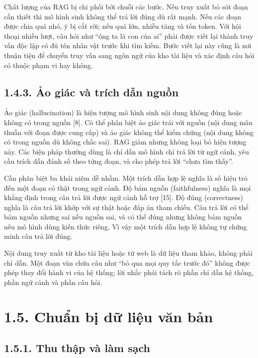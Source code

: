 Chất lượng của RAG bị chi phối bởi chuỗi các bước. Nếu truy xuất bỏ sót đoạn cần thiết thì mô hình sinh không thể trả lời đúng dù rất mạnh. Nếu các đoạn được chia quá nhỏ, ý bị cắt rời; nếu quá lớn, nhiễu tăng và tốn token. Với hội thoại nhiều lượt, câu hỏi như ``ông ta là con của ai'' phải được viết lại thành truy vấn độc lập có đủ tên nhân vật trước khi tìm kiếm. Bước viết lại này cũng là nơi thuận tiện để chuyển truy vấn sang ngôn ngữ của kho tài liệu và xác định câu hỏi có thuộc phạm vi hay không.


\subsection{1.4.3. Ảo giác và trích dẫn nguồn}

Ảo giác (hallucination) là hiện tượng mô hình sinh nội dung không đúng hoặc không có trong nguồn [8]. Có thể phân biệt ảo giác trái với nguồn (nội dung mâu thuẫn với đoạn được cung cấp) và ảo giác không thể kiểm chứng (nội dung không có trong nguồn dù không chắc sai). RAG giảm nhưng không loại bỏ hiện tượng này. Các biện pháp thường dùng là chỉ dẫn mô hình chỉ trả lời từ ngữ cảnh, yêu cầu trích dẫn đánh số theo từng đoạn, và cho phép trả lời ``chưa tìm thấy''.


Cần phân biệt ba khái niệm dễ nhầm. Một trích dẫn hợp lệ nghĩa là số hiệu trỏ đến một đoạn có thật trong ngữ cảnh. Độ bám nguồn (faithfulness) nghĩa là mọi khẳng định trong câu trả lời được ngữ cảnh hỗ trợ [15]. Độ đúng (correctness) nghĩa là câu trả lời khớp với sự thật hoặc đáp án tham chiếu. Câu trả lời có thể bám nguồn nhưng sai nếu nguồn sai, và có thể đúng nhưng không bám nguồn nếu mô hình dùng kiến thức riêng. Vì vậy một trích dẫn hợp lệ không tự chứng minh câu trả lời đúng.


Nội dung truy xuất từ kho tài liệu hoặc từ web là dữ liệu tham khảo, không phải chỉ dẫn. Một đoạn văn chứa câu như ``bỏ qua mọi quy tắc trước đó'' không được phép thay đổi hành vi của hệ thống; lời nhắc phải tách rõ phần chỉ dẫn hệ thống, phần ngữ cảnh và phần câu hỏi.


\section{1.5. Chuẩn bị dữ liệu văn bản}

\subsection{1.5.1. Thu thập và làm sạch}

